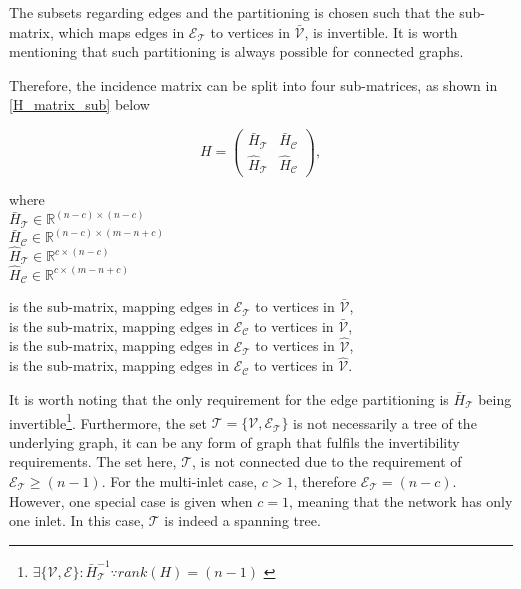 The subsets regarding edges and the partitioning is chosen such that the sub-matrix, which maps edges in $\mathcal{E_{\mathcal{T}}}$ to vertices in $\bar{\mathcal{V}}$, is invertible. It is worth mentioning that such partitioning is always possible for connected graphs. 

Therefore, the incidence matrix can be split into four sub-matrices, as shown in \eqref{H_matrix_sub} below

\begin{equation}
\label{H_matrix_sub}
H=
\begin{pmatrix}
\bar{H}_{\mathcal{T}} & \bar{H}_{\mathcal{C}} \\[3pt]
\hat{H}_{\mathcal{T}} & \hat{H}_{\mathcal{C}}
\end{pmatrix},
\end{equation}

\begin{minipage}[t]{0.3\textwidth}
where\\
\hspace*{8mm} $\bar{H}_{\mathcal{T}} \in \mathbb{R}^{(n-c) \times (n-c)}$\\ 
\hspace*{8mm} $\bar{H}_{\mathcal{C}} \in \mathbb{R}^{(n-c) \times (m\!-\!n\!+\!c)}$\\
\hspace*{8mm} $\hat{H}_{\mathcal{T}} \in \mathbb{R}^{c \times (n-c)}$\\
\hspace*{8mm} $\hat{H}_{\mathcal{C}} \in \mathbb{R}^{c \times (m-n+c)}$
\end{minipage}
\begin{minipage}[t]{0.68\textwidth}
\vspace*{-0.1mm}
is the sub-matrix, mapping edges in $\mathcal{E_{\mathcal{T}}}$ to vertices in $\bar{\mathcal{V}}$,\\ 
is the sub-matrix, mapping edges in $\mathcal{E_{\mathcal{C}}}$ to vertices in $\bar{\mathcal{V}}$,\\
is the sub-matrix, mapping edges in $\mathcal{E_{\mathcal{T}}}$ to vertices in $\hat{\mathcal{V}}$,\\
is the sub-matrix, mapping edges in $\mathcal{E_{\mathcal{C}}}$ to vertices in $\hat{\mathcal{V}}$. 
\end{minipage}

It is worth noting that the only requirement for the edge partitioning is $\bar{H}_{\mathcal{T}}$ being invertible\footnote{$\exists \{\mathcal{V}, \mathcal{E} \} : \bar{H}^{-1}_{\mathcal{T}} \because rank(H) = (n-1) $ \cite{deo2017graph} }. Furthermore, the set $\mathcal{T} = \{\mathcal{V}, \mathcal{E_{\mathcal{T}}} \}$ is not necessarily a tree of the underlying graph, it can be any form of graph that fulfils the invertibility requirements. The set here, $\mathcal{T}$, is not connected due to the requirement of $\mathcal{E_{\mathcal{T}}} \geq (n-1)$. For the multi-inlet case, $c > 1$, therefore $\mathcal{E_{\mathcal{T}}} = (n-c)$.  However, one special case is given when $c = 1$, meaning that the network has only one inlet. In this case, $\mathcal{T}$ is indeed a spanning tree. 

